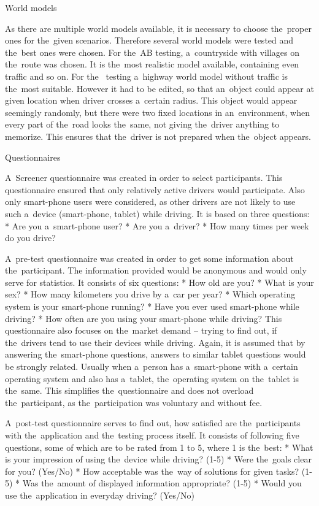 \seccc World models

As there are multiple world models available, it is necessary to choose the~proper ones for the~given scenarios. Therefore several world models were tested and the~best ones were chosen. For the~AB testing, a~countryside with villages on the~route was chosen. It is the~most realistic model available, containing even traffic and so on. For the~ testing a~highway world model without traffic is the~most suitable. However it had to be edited, so that an~object could appear at given location when driver crosses a~certain radius. This object would appear seemingly randomly, but there were two fixed locations in an~environment, when every part of the~road looks the~same, not giving the~driver anything to memorize. This ensures that the~driver is not prepared when the~object appears.

\seccc Questionnaires

A~Screener questionnaire was created in order to select participants. This questionnaire ensured that only relatively active drivers would participate. Also only smart-phone users were considered, as other drivers are not likely to use such a~device (smart-phone, tablet) while driving. It is based on three questions:
\begitems
* Are you a~smart-phone user?
* Are you a~driver?
* How many times per week do you drive?
\enditems

A~pre-test questionnaire was created in order to get some information about the~participant. The information provided would be anonymous and would only serve for statistics. It consists of six questions:
\begitems
* How old are you?
* What is your sex?
* How many kilometers you drive by a~car per year?
* Which operating system is your smart-phone running?
* Have you ever used smart-phone while driving?
* How often are you using your smart-phone while driving?
\enditems
This questionnaire also focuses on the~market demand -- trying to find out, if the~drivers tend to use their devices while driving. Again, it is assumed that by answering the~smart-phone questions, answers to similar tablet questions would be strongly related. Usually when a~person has a~smart-phone with a~certain operating system and also has a~tablet, the~operating system on the~tablet is the~same. This simplifies the~questionnaire and does not overload the~participant, as the~participation was voluntary and without fee.

A~post-test questionnaire serves to find out, how satisfied are the~participants with the~application and the~testing process itself. It consists of following five questions, some of which are to be rated from 1 to 5, where 1 is the~best:
\begitems
* What is your impression of using the~device while driving? (1-5)
* Were the~goals clear for you? (Yes/No)
* How acceptable was the~way of solutions for given tasks? (1-5)
* Was the~amount of displayed information appropriate? (1-5)
* Would you use the~application in everyday driving? (Yes/No)
\enditems

